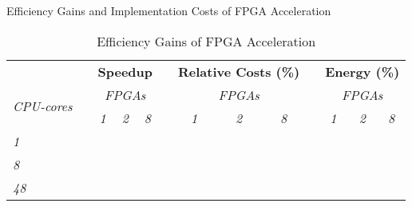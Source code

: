 \documentclass[12pt,american]{article}
\newcommand{\resultsfolder}{./results}
\newcommand{\devfpgaI}{fpgaI}
\newcommand{\devfpgaII}{fpgaII}
\newcommand{\devfpgaIII}{fpgaIII}
\newcommand{\devcpu}{cpu-cores}
\newcommand{\nKMIkI}{nKM4-nk100}
\newcommand{\cpucoreI}{1}
\newcommand{\cpucoreII}{8}
\newcommand{\cpucoreIII}{48}
\newcommand{\fpgaspeedICPUI}{}
\newcommand{\fpgaspeedICPUII}{}
\newcommand{\fpgaspeedICPUIII}{}
\newcommand{\fpgaspeedIICPUI}{}
\newcommand{\fpgaspeedIICPUII}{}
\newcommand{\fpgaspeedIICPUIII}{}
\newcommand{\fpgaspeedIIICPUI}{}
\newcommand{\fpgaspeedIIICPUII}{}
\newcommand{\fpgaspeedIIICPUIII}{}
\newcommand{\fpgacostICPUI}{}
\newcommand{\fpgacostICPUII}{}
\newcommand{\fpgacostICPUIII}{}
\newcommand{\fpgacostIICPUI}{}
\newcommand{\fpgacostIICPUII}{}
\newcommand{\fpgacostIICPUIII}{}
\newcommand{\fpgacostIIICPUI}{}
\newcommand{\fpgacostIIICPUII}{}
\newcommand{\fpgacostIIICPUIII}{}
\newcommand{\fpgaenergyICPUI}{}
\newcommand{\fpgaenergyICPUII}{}
\newcommand{\fpgaenergyICPUIII}{}
\newcommand{\fpgaenergyIICPUI}{}
\newcommand{\fpgaenergyIICPUII}{}
\newcommand{\fpgaenergyIICPUIII}{}
\newcommand{\fpgaenergyIIICPUI}{}
\newcommand{\fpgaenergyIIICPUII}{}
\newcommand{\fpgaenergyIIICPUIII}{}
\begin{document}
\begin{table}[ht!]
\caption{Efficiency Gains and Implementation Costs of FPGA Acceleration}
\label{tab:baseline}
\vspace{-0.1in}
\begin{center}
\begin{subtable}{\textwidth}
\caption{Efficiency Gains of FPGA Acceleration}
\label{tab:baseline:A}
\setlength\tabcolsep{4pt}
\begin{tabularx}{\textwidth}{XXXXXXXXXXXXX}
\toprule
&&\multicolumn{3}{c}{\textbf{Speedup}}&&\multicolumn{3}{c}{\textbf{Relative Costs (\%)}}&&\multicolumn{3}{c}{\textbf{Energy (\%)}}\\
\cmidrule{3-5} \cmidrule{7-9} \cmidrule{11-13}
\multirow{2}{*}{\textit{CPU-cores}}        &&\multicolumn{3}{c}{\textit{FPGAs}}&&\multicolumn{3}{c}{\textit{FPGAs}}&&\multicolumn{3}{c}{\textit{FPGAs}}\\
&&\multicolumn{1}{c}{\textit{1}}&\multicolumn{1}{c}{\textit{2}}&\multicolumn{1}{c}{\textit{8}}&&\multicolumn{1}{c}{\textit{1}}&\multicolumn{1}{c}{\textit{2}}&\multicolumn{1}{c}{\textit{8}}&&\multicolumn{1}{c}{\textit{1}}&\multicolumn{1}{c}{\textit{2}}&\multicolumn{1}{c}{\textit{8}}\\
\cmidrule{3-5} \cmidrule{7-9} \cmidrule{11-13}        
\textit{1}&&\fpgaspeedICPUI&\fpgaspeedIICPUI&\fpgaspeedIIICPUI&& \fpgacostICPUI&\fpgacostIICPUI&\fpgacostIIICPUI&& \fpgaenergyICPUI&\fpgaenergyIICPUI&\fpgaenergyIIICPUI \\
\textit{8}&&\fpgaspeedICPUII&\fpgaspeedIICPUII&\fpgaspeedIIICPUII&&\fpgacostICPUII&\fpgacostIICPUII&\fpgacostIIICPUII&&\fpgaenergyICPUII&\fpgaenergyIICPUII&\fpgaenergyIIICPUII \\
\textit{48}&&\fpgaspeedICPUIII&\fpgaspeedIICPUIII&\fpgaspeedIIICPUIII&&\fpgacostICPUIII&\fpgacostIICPUIII&\fpgacostIIICPUIII&&\fpgaenergyICPUIII&\fpgaenergyIICPUIII&\fpgaenergyIIICPUIII \\
\bottomrule
\end{tabularx}
\end{subtable}   

\vspace{10pt}


\end{center}
\end{table}
\end{document}
